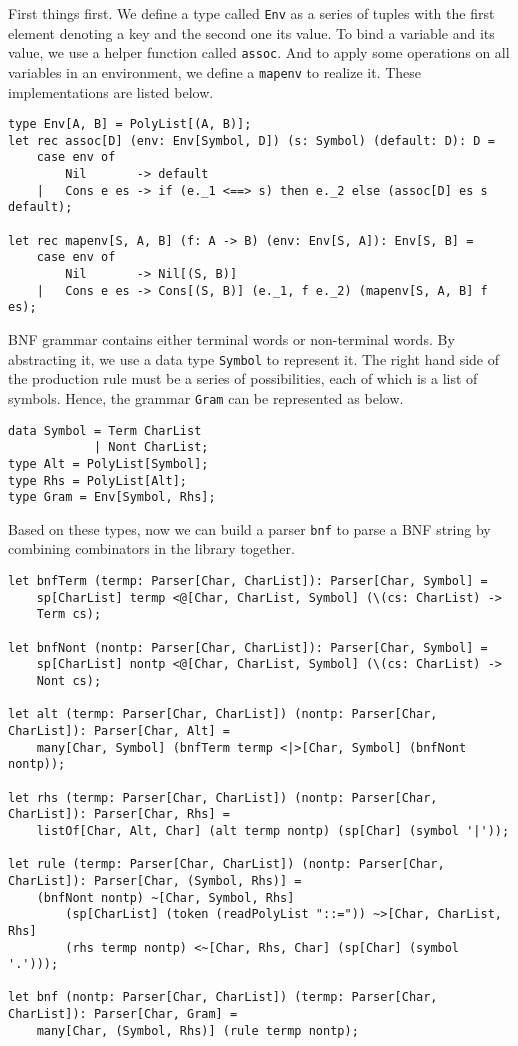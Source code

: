 First things first. We define a type called \texttt{Env} as a series of tuples with the first element denoting a key and the second one its value. To bind a variable and its value, we use a helper function called \texttt{assoc}. And to apply some operations on all variables in an environment, we define a \texttt{mapenv} to realize it. These implementations are listed below.
\begin{lstlisting}
type Env[A, B] = PolyList[(A, B)];
let rec assoc[D] (env: Env[Symbol, D]) (s: Symbol) (default: D): D =
    case env of
        Nil       -> default
    |   Cons e es -> if (e._1 <==> s) then e._2 else (assoc[D] es s default);
    
let rec mapenv[S, A, B] (f: A -> B) (env: Env[S, A]): Env[S, B] =
    case env of
        Nil       -> Nil[(S, B)]
    |   Cons e es -> Cons[(S, B)] (e._1, f e._2) (mapenv[S, A, B] f es);
\end{lstlisting}
BNF grammar contains either terminal words or non-terminal words. By abstracting it, we use a data type \texttt{Symbol} to represent it. The right hand side of the production rule must be a series of possibilities, each of which is a list of symbols. Hence, the grammar \texttt{Gram} can be represented as below.
\begin{lstlisting}
data Symbol = Term CharList
            | Nont CharList;
type Alt = PolyList[Symbol];
type Rhs = PolyList[Alt];
type Gram = Env[Symbol, Rhs];
\end{lstlisting}
Based on these types, now we can build a parser \texttt{bnf} to parse a BNF string by combining combinators in the library together.
\begin{lstlisting}
let bnfTerm (termp: Parser[Char, CharList]): Parser[Char, Symbol] =
    sp[CharList] termp <@[Char, CharList, Symbol] (\(cs: CharList) -> 
    Term cs);
    
let bnfNont (nontp: Parser[Char, CharList]): Parser[Char, Symbol] =
    sp[CharList] nontp <@[Char, CharList, Symbol] (\(cs: CharList) -> 
    Nont cs);
    
let alt (termp: Parser[Char, CharList]) (nontp: Parser[Char, CharList]): Parser[Char, Alt] =
    many[Char, Symbol] (bnfTerm termp <|>[Char, Symbol] (bnfNont nontp));
    
let rhs (termp: Parser[Char, CharList]) (nontp: Parser[Char, CharList]): Parser[Char, Rhs] =
    listOf[Char, Alt, Char] (alt termp nontp) (sp[Char] (symbol '|'));
    
let rule (termp: Parser[Char, CharList]) (nontp: Parser[Char, CharList]): Parser[Char, (Symbol, Rhs)] =
    (bnfNont nontp) ~[Char, Symbol, Rhs]
        (sp[CharList] (token (readPolyList "::=")) ~>[Char, CharList, Rhs] 
        (rhs termp nontp) <~[Char, Rhs, Char] (sp[Char] (symbol '.')));
        
let bnf (nontp: Parser[Char, CharList]) (termp: Parser[Char, CharList]): Parser[Char, Gram] =
    many[Char, (Symbol, Rhs)] (rule termp nontp);
\end{lstlisting}
